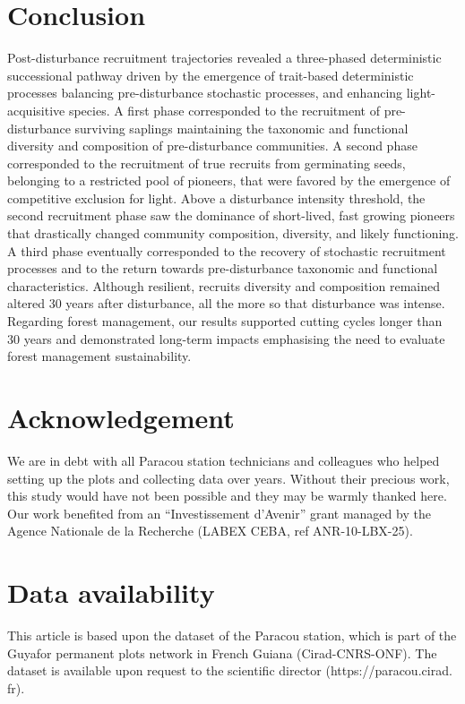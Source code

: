 \documentclass[fleqn,10pt]{ArtEcoFoG} %
\begin{document}
\section{Conclusion}\label{conclusion}

Post-disturbance recruitment trajectories revealed a three-phased
deterministic successional pathway driven by the emergence of
trait-based deterministic processes balancing pre-disturbance stochastic
processes, and enhancing light-acquisitive species. A first phase
corresponded to the recruitment of pre-disturbance surviving saplings
maintaining the taxonomic and functional diversity and composition of
pre-disturbance communities. A second phase corresponded to the
recruitment of true recruits from germinating seeds, belonging to a
restricted pool of pioneers, that were favored by the emergence of
competitive exclusion for light. Above a disturbance intensity
threshold, the second recruitment phase saw the dominance of
short-lived, fast growing pioneers that drastically changed community
composition, diversity, and likely functioning. A third phase eventually
corresponded to the recovery of stochastic recruitment processes and to
the return towards pre-disturbance taxonomic and functional
characteristics. Although resilient, recruits diversity and composition
remained altered 30 years after disturbance, all the more so that
disturbance was intense. Regarding forest management, our results
supported cutting cycles longer than 30 years and demonstrated long-term
impacts emphasising the need to evaluate forest management
sustainability.

\section{Acknowledgement}\label{acknowledgement}

We are in debt with all Paracou station technicians and colleagues who
helped setting up the plots and collecting data over years. Without
their precious work, this study would have not been possible and they
may be warmly thanked here. Our work benefited from an ``Investissement
d'Avenir'' grant managed by the Agence Nationale de la Recherche (LABEX
CEBA, ref ANR-10-LBX-25).

\section{Data availability}\label{data-availability}

This article is based upon the dataset of the Paracou station, which is
part of the Guyafor permanent plots network in French Guiana
(Cirad-CNRS-ONF). The dataset is available upon request to the
scientific director (https://paracou.cirad. fr).
\end{document}
